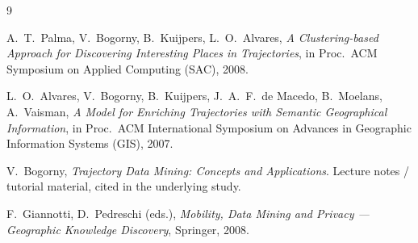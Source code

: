 \documentclass[11pt,a4paper]{article}
\begin{document}
\begin{thebibliography}{9}

A.~T.~Palma, V.~Bogorny, B.~Kuijpers, L.~O.~Alvares,
\emph{A Clustering-based Approach for Discovering Interesting Places in
Trajectories}, in Proc.\ ACM Symposium on Applied Computing (SAC), 2008.

L.~O.~Alvares, V.~Bogorny, B.~Kuijpers, J.~A.~F.~de Macedo,
B.~Moelans, A.~Vaisman,
\emph{A Model for Enriching Trajectories with Semantic Geographical
Information}, in Proc.\ ACM International Symposium on Advances in
Geographic Information Systems (GIS), 2007.

V.~Bogorny, \emph{Trajectory Data Mining: Concepts and Applications}.
Lecture notes / tutorial material, cited in the underlying study.

F.~Giannotti, D.~Pedreschi (eds.), \emph{Mobility, Data Mining and
Privacy --- Geographic Knowledge Discovery}, Springer, 2008.

\end{thebibliography}
\end{document}
